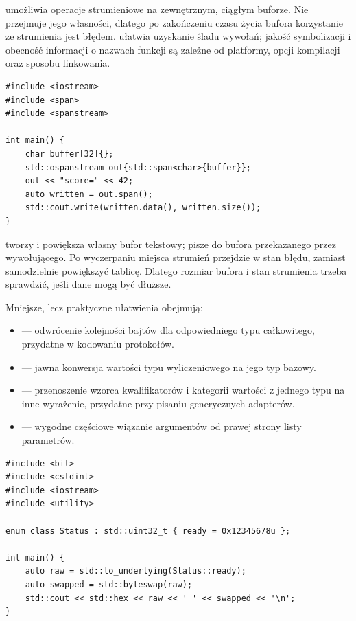  umożliwia operacje strumieniowe na zewnętrznym,
ciągłym buforze. Nie przejmuje jego własności, dlatego po zakończeniu
czasu życia bufora korzystanie ze strumienia jest błędem.
 ułatwia uzyskanie śladu wywołań; jakość
symbolizacji i obecność informacji o nazwach funkcji są zależne
od platformy, opcji kompilacji oraz sposobu linkowania.

\begin{lstlisting}[caption={Zapis do bufora o stalej pojemnosci przez ospanstream (C++23).}]
#include <iostream>
#include <span>
#include <spanstream>

int main() {
    char buffer[32]{};
    std::ospanstream out{std::span<char>{buffer}};
    out << "score=" << 42;
    auto written = out.span();
    std::cout.write(written.data(), written.size());
}
\end{lstlisting}

 tworzy i powiększa własny bufor tekstowy;
 pisze do bufora przekazanego przez wywołującego.
Po wyczerpaniu miejsca strumień przejdzie w stan błędu, zamiast
samodzielnie powiększyć tablicę. Dlatego rozmiar bufora i stan
strumienia trzeba sprawdzić, jeśli dane mogą być dłuższe.

Mniejsze, lecz praktyczne ułatwienia obejmują:
\begin{itemize}
\item {} --- odwrócenie kolejności bajtów dla
odpowiedniego typu całkowitego, przydatne w kodowaniu protokołów.
\item {} --- jawna konwersja wartości typu wyliczeniowego
na jego typ bazowy.
\item {} --- przenoszenie wzorca kwalifikatorów
 i kategorii wartości z jednego typu na inne wyrażenie,
przydatne przy pisaniu generycznych adapterów.
\item {} --- wygodne częściowe wiązanie argumentów
od prawej strony listy parametrów.
\end{itemize}

\begin{lstlisting}[caption={Konwersja enum i zamiana kolejnosci bajtow (C++23).}]
#include <bit>
#include <cstdint>
#include <iostream>
#include <utility>

enum class Status : std::uint32_t { ready = 0x12345678u };

int main() {
    auto raw = std::to_underlying(Status::ready);
    auto swapped = std::byteswap(raw);
    std::cout << std::hex << raw << ' ' << swapped << '\n';
}
\end{lstlisting}

